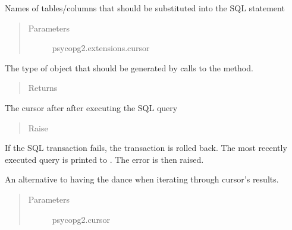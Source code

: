 \documentclass[letterpaper,10pt,english]{sphinxmanual}
\begin{document}
\begin{fulllineitems}
\begin{fulllineitems}
\begin{quote}
\begin{description}
\end{description}\end{quote}

Names of tables/columns that should be substituted into the SQL statement
\begin{quote}\begin{description}
\item[{Parameters}] \leavevmode
{} \textendash{} psycopg2.extensions.cursor

\end{description}\end{quote}

The type of object that should be generated by calls to the  
method.
\begin{quote}\begin{description}
\item[{Returns}] \leavevmode
{}

\end{description}\end{quote}

The cursor after after executing the SQL query
\begin{quote}\begin{description}
\item[{Raise}] \leavevmode
{}

\end{description}\end{quote}

If the SQL transaction fails, the transaction is rolled back. The most 
recently executed query is printed to . The error is then 
raised.

\end{fulllineitems}


\begin{fulllineitems}
\label{\detokenize{tiger_leagues/models/readme:tiger_leagues.models.db_model.Database.iterator}}
An alternative to having the  dance when iterating through cursor’s results.
\begin{quote}\begin{description}
\item[{Parameters}] \leavevmode
{} \textendash{} psycopg2.cursor


\end{description}
\end{quote}
\end{fulllineitems}
\end{fulllineitems}
\end{document}
